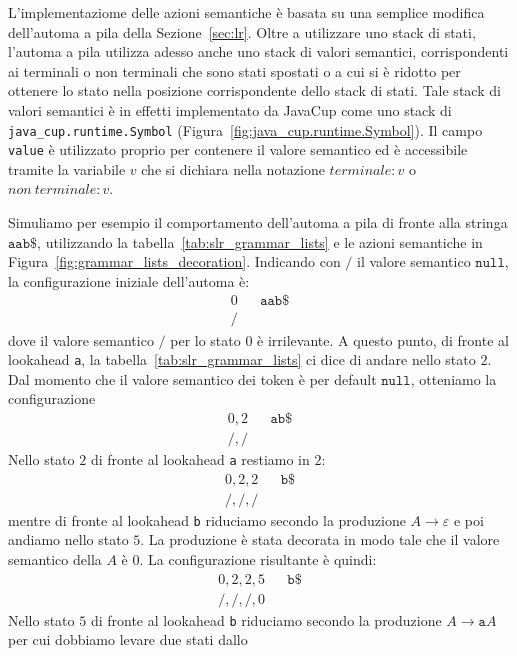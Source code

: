 L'implementaziome delle azioni semantiche \`e basata su una semplice
modifica dell'automa a pila della Sezione~\ref{sec:lr}. Oltre a utilizzare
uno stack di stati, l'automa a pila utilizza adesso anche uno stack di
valori semantici, corrispondenti ai terminali o non terminali che sono
stati spostati o a cui si \`e ridotto per ottenere lo stato
nella posizione corrispondente dello stack di stati.
Tale stack di valori semantici \`e in effetti implementato da JavaCup come
uno stack di \texttt{java\_cup.runtime.Symbol}
(Figura~\ref{fig:java_cup.runtime.Symbol}). Il campo \texttt{value} \`e
utilizzato proprio per contenere il valore semantico ed \`e accessibile
tramite la variabile $v$ che si dichiara nella notazione
$\mathit{terminale}:v$ o $\mathit{non\ terminale}:v$.

Simuliamo per esempio
il comportamento dell'automa a pila di fronte alla stringa
$\mathtt{aab\$}$, utilizzando la tabella~\eqref{tab:slr_grammar_lists} e le
azioni semantiche in Figura~\ref{fig:grammar_lists_decoration}.
Indicando con $/$ il valore semantico $\mathtt{null}$, la
configurazione iniziale dell'automa \`e:
%
\begin{align*}
  0 & & \mathtt{aab\$}\\
  / & &
\end{align*}
%
dove il valore semantico $/$ per lo stato $0$ \`e irrilevante. A questo
punto, di fronte al lookahead \texttt{a}, la
tabella~\eqref{tab:slr_grammar_lists} ci dice di andare nello stato $2$.
Dal momento che il valore semantico dei token \`e per default
$\mathtt{null}$, otteniamo la configurazione
%
\begin{align*}
  0,2 & & \mathtt{ab\$}\\
  /,/ & &
\end{align*}
%
Nello stato $2$ di fronte al lookahead \texttt{a} restiamo in $2$:
%
\begin{align*}
  0,2,2 & & \mathtt{b\$}\\
  /,/,/ & &
\end{align*}
%
mentre di fronte al lookahead \texttt{b} riduciamo secondo la
produzione $A\to\varepsilon$ e poi andiamo nello stato $5$.
La produzione \`e stata decorata in modo tale che il
valore semantico della $A$ \`e $0$. La configurazione risultante \`e quindi:
%
\begin{align*}
  0,2,2,5 & & \mathtt{b\$}\\
  /,/,/,0 & &
\end{align*}
%
Nello stato $5$ di fronte al lookahead \texttt{b} riduciamo secondo
la produzione $A\to\mathtt{a}A$ per cui dobbiamo levare due stati dallo

